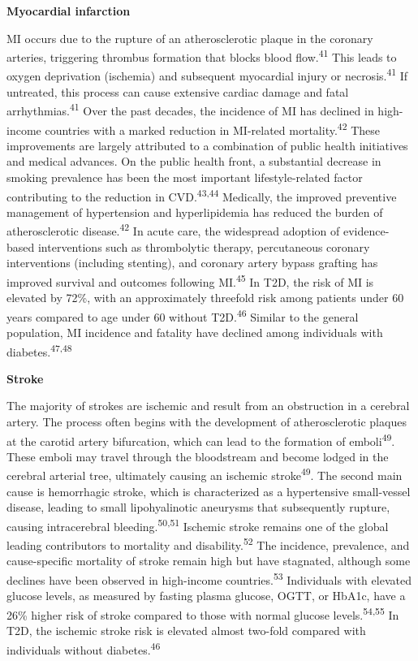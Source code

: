\documentclass[
  a4paper,
  headsepline=true,
  open=left]{scrbook}
\begin{document}
\textbf{Myocardial infarction}

MI occurs due to the rupture of an atherosclerotic plaque in the
coronary arteries, triggering thrombus formation that blocks blood
flow.\textsuperscript{41} This leads to oxygen deprivation (ischemia)
and subsequent myocardial injury or necrosis.\textsuperscript{41} If
untreated, this process can cause extensive cardiac damage and fatal
arrhythmias.\textsuperscript{41} Over the past decades, the incidence of
MI has declined in high-income countries with a marked reduction in
MI-related mortality.\textsuperscript{42} These improvements are largely
attributed to a combination of public health initiatives and medical
advances. On the public health front, a substantial decrease in smoking
prevalence has been the most important lifestyle-related factor
contributing to the reduction in CVD.\textsuperscript{43,44} Medically,
the improved preventive management of hypertension and hyperlipidemia
has reduced the burden of atherosclerotic disease.\textsuperscript{42}
In acute care, the widespread adoption of evidence-based interventions
such as thrombolytic therapy, percutaneous coronary interventions
(including stenting), and coronary artery bypass grafting has improved
survival and outcomes following MI.\textsuperscript{45} In T2D, the risk
of MI is elevated by 72\%, with an approximately threefold risk among
patients under 60 years compared to age under 60 without
T2D.\textsuperscript{46} Similar to the general population, MI incidence
and fatality have declined among individuals with
diabetes.\textsuperscript{47,48}

\textbf{Stroke}

The majority of strokes are ischemic and result from an obstruction in a
cerebral artery. The process often begins with the development of
atherosclerotic plaques at the carotid artery bifurcation, which can
lead to the formation of emboli\textsuperscript{49}. These emboli may
travel through the bloodstream and become lodged in the cerebral
arterial tree, ultimately causing an ischemic
stroke\textsuperscript{49}. The second main cause is hemorrhagic stroke,
which is characterized as a hypertensive small-vessel disease, leading
to small lipohyalinotic aneurysms that subsequently rupture, causing
intracerebral bleeding.\textsuperscript{50,51} Ischemic stroke remains
one of the global leading contributors to mortality and
disability.\textsuperscript{52} The incidence, prevalence, and
cause-specific mortality of stroke remain high but have stagnated,
although some declines have been observed in high-income
countries.\textsuperscript{53} Individuals with elevated glucose levels,
as measured by fasting plasma glucose, OGTT, or HbA1c, have a 26\%
higher risk of stroke compared to those with normal glucose
levels.\textsuperscript{54,55} In T2D, the ischemic stroke risk is
elevated almost two-fold compared with individuals without
diabetes.\textsuperscript{46}
\end{document}
